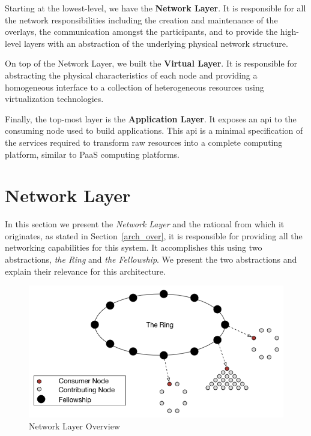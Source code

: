 \documentclass[12pt, titlepage]{uo_temp}
\begin{document}
     Starting at the lowest-level, we have the \textbf{Network Layer}. It is responsible
     for all the network responsibilities including the creation and maintenance of the
     overlays, the communication amongst the participants, and to provide the high-level
     layers with an abstraction of the underlying physical network structure.

     On top of the Network Layer, we built the \textbf{Virtual Layer}. It is
     responsible for abstracting the physical characteristics of each node and providing a
     homogeneous interface to a collection of heterogeneous resources using virtualization
     technologies.

     Finally, the top-most layer is the \textbf{Application Layer}. It exposes an
     \gls{api} to the consuming node used to build applications. This \gls{api} is a
     minimal specification of the services required to transform raw resources into a
     complete computing platform, similar to PaaS computing platforms.

     \section{Network Layer}
     In this section we present the \emph{Network Layer} and the rational from which it
     originates, as stated in Section~\ref{arch_over}, it is responsible for providing all
     the networking capabilities for this system. It accomplishes this using two
     abstractions, \emph{the Ring} and \emph{the Fellowship}. We present the two
     abstractions and explain their relevance for this architecture.

     \begin{figure}
       \centering
       \includegraphics[width=125mm]{images/arch_net_ring_fellow.png}
       \caption{Network Layer Overview}
     \end{figure}
\end{document}
